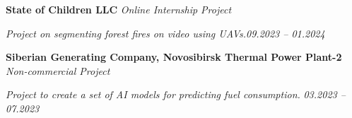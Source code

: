 
\textbf{State of Children LLC} \hfill \emph{Online Internship Project}

	\textit{Project on segmenting forest fires on video using UAVs.}\hfill \emph{09.2023 – 01.2024}\vspace{0.2cm}
	
	\textbf{Siberian Generating Company, Novosibirsk Thermal Power Plant-2} \hfill \emph{Non-commercial Project}
	
\textit{Project to create a set of AI models for predicting fuel consumption.} \hfill \emph{03.2023 – 07.2023}\vspace{0.2cm}

